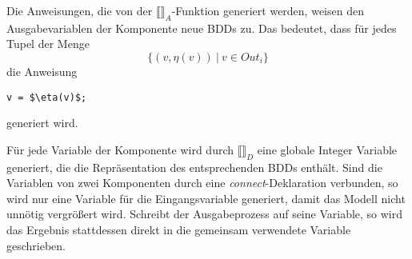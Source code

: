 Die Anweisungen, die von der $\llbracket\rrbracket_A$-Funktion generiert werden, weisen den Ausgabevariablen der Komponente neue BDDs zu.
Das bedeutet, dass für jedes Tupel der Menge
\[ \{ (v,\eta(v))\ |\ v\in \mathit{Out}_i \} \]
die Anweisung
\begin{lstlisting}[language=promela,mathescape=true]
  v = $\eta(v)$;
\end{lstlisting}
generiert wird.

Für jede Variable der Komponente wird durch $\llbracket\rrbracket_D$ eine globale Integer Variable generiert, die die Repräsentation des entsprechenden BDDs enthält.
Sind die Variablen von zwei Komponenten durch eine \emph{connect}-Deklaration verbunden, so wird nur eine Variable für die Eingangsvariable generiert, damit das Modell nicht unnötig vergrößert wird.
Schreibt der Ausgabeprozess auf seine Variable, so wird das Ergebnis stattdessen direkt in die gemeinsam verwendete Variable geschrieben.